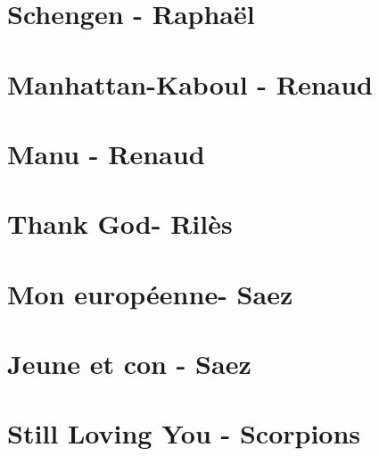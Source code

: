 \documentclass{guitartabs}
\begin{document}
\section{Schengen - Raphaël}
\begin{guitar}

\end{guitar}

\section{Manhattan-Kaboul - Renaud}
\begin{guitar}

\end{guitar}

\section{Manu - Renaud}
\begin{guitar}

\end{guitar}

\section{Thank God- Rilès}
\begin{guitar}

\end{guitar}

\section{Mon européenne- Saez}
\begin{guitar}

\end{guitar}


\section{Jeune et con - Saez}
\begin{guitar}

\end{guitar}

\section{Still Loving You - Scorpions}
\begin{guitar}

\end{guitar}
\end{document}

